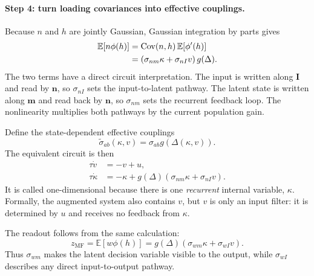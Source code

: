 \documentclass[11pt]{article}
\newcommand{\vm}{\mathbf{m}}
\newcommand{\vn}{\mathbf{n}}
\newcommand{\vI}{\mathbf{I}}
\begin{document}
\paragraph{Step 4: turn loading covariances into effective couplings.}
Because $n$ and $h$ are jointly Gaussian, Gaussian integration by parts gives
\begin{align}
  \mathbb{E}\!\left[n\phi(h)\right]
  &=
  \operatorname{Cov}(n,h)\,
  \mathbb{E}\!\left[\phi'(h)\right]
  \notag\\
  &=
  \left(\sigma_{nm}\kappa+\sigma_{nI}v\right)g(\Delta).
  \label{eq:mf_task_stein}
\end{align}
The two terms have a direct circuit interpretation. The input is written along
$\vI$ and read by $\vn$, so $\sigma_{nI}$ sets the input-to-latent pathway.
The latent state is written along $\vm$ and read back by $\vn$, so
$\sigma_{nm}$ sets the recurrent feedback loop. The nonlinearity multiplies
both pathways by the current population gain.

Define the state-dependent effective couplings
\begin{equation}
  \widetilde{\sigma}_{ab}(\kappa,v)
  =
  \sigma_{ab}g\!\left(\Delta(\kappa,v)\right).
  \label{eq:mf_task_effective_covariance}
\end{equation}
The equivalent circuit is then
\begin{equation}
  \boxed{
  \begin{aligned}
    \tau\dot v
    &= -v+u,\\
    \tau\dot\kappa
    &= -\kappa
       +g(\Delta)\left(\sigma_{nm}\kappa+\sigma_{nI}v\right).
  \end{aligned}}
  \label{eq:mf_task_system}
\end{equation}
It is called one-dimensional because there is one \emph{recurrent} internal
variable, $\kappa$. Formally, the augmented system also contains $v$, but $v$ is
only an input filter: it is determined by $u$ and receives no feedback from
$\kappa$.

The readout follows from the same calculation:
\begin{equation}
  z_{\mathrm{MF}}
  =
  \mathbb{E}\!\left[w\phi(h)\right]
  =
  g(\Delta)\left(\sigma_{wm}\kappa+\sigma_{wI}v\right).
  \label{eq:mf_task_output}
\end{equation}
Thus $\sigma_{wm}$ makes the latent decision variable visible to the output,
while $\sigma_{wI}$ describes any direct input-to-output pathway.
\end{document}
